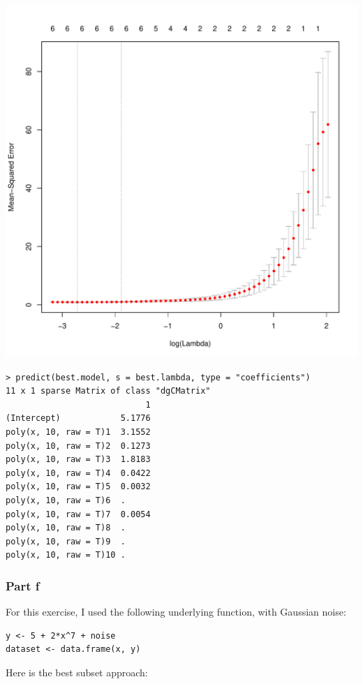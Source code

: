 \documentclass[11pt, a4paper]{article}
\begin{document}
\includegraphics[scale=0.55]{lasso-plot.pdf}


\begin{verbatim}
> predict(best.model, s = best.lambda, type = "coefficients")
11 x 1 sparse Matrix of class "dgCMatrix"
                            1
(Intercept)            5.1776
poly(x, 10, raw = T)1  3.1552
poly(x, 10, raw = T)2  0.1273
poly(x, 10, raw = T)3  1.8183
poly(x, 10, raw = T)4  0.0422
poly(x, 10, raw = T)5  0.0032
poly(x, 10, raw = T)6  .     
poly(x, 10, raw = T)7  0.0054
poly(x, 10, raw = T)8  .     
poly(x, 10, raw = T)9  .     
poly(x, 10, raw = T)10 .
\end{verbatim}
\subsubsection{Part f}
\label{sec-2-1-5}

For this exercise, I used the following underlying function, with
Gaussian noise:


\begin{verbatim}
y <- 5 + 2*x^7 + noise
dataset <- data.frame(x, y)
\end{verbatim}

Here is the best subset approach:
\end{document}

